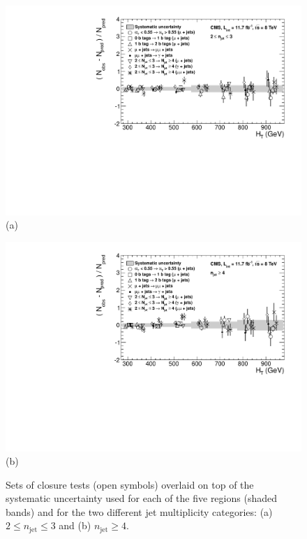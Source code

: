 \begin{figure}[ht]
\centering
\begin{minipage}[b]{0.85 \linewidth}
\includegraphics[width = 1.0\linewidth]{plots/syst-le3j.pdf}
\centering(a)  
\end{minipage}
\quad
\begin{minipage}[b]{0.85\linewidth}
\includegraphics[width = 1.0\linewidth]{plots/syst-ge4j.pdf}
\centering(b) 
\end{minipage}
\caption[Sets of closure tests overlaid on top of the systematic uncertainty used for each of the five \theht regions.]{Sets of closure tests (open symbols) overlaid on top of the systematic uncertainty used for each of the five \theht regions (shaded bands) and for the two different jet multiplicity categories: (a) $2 \leq n_{\text{jet}} \leq 3$ and (b) $n_{\text{jet}} \geq 4$.}
\label{fig:uncertaintyplots}
\end{figure}

